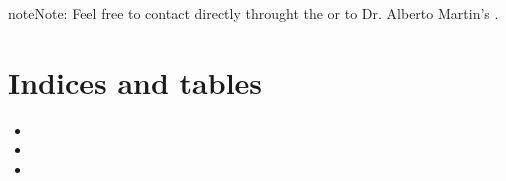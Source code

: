 \documentclass[letterpaper,10pt,english]{sphinxmanual}
\begin{document}
\begin{sphinxadmonition}{note}{Note:}
Feel free to contact directly throught the 
or to Dr. Alberto Martin’s .
\end{sphinxadmonition}


\chapter{Indices and tables}
\label{\detokenize{index:indices-and-tables}}\begin{itemize}
\item {} 

\item {} 

\item {} 

\end{itemize}



\renewcommand{\indexname}{Index}
\printindex
\end{document}
